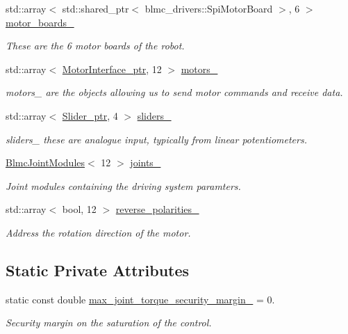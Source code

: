 \begin{DoxyCompactItemize}
std\+::array$<$ std\+::shared\+\_\+ptr$<$ blmc\+\_\+drivers\+::\+Spi\+Motor\+Board $>$, 6 $>$ \hyperlink{classblmc__robots_1_1Solo12_a84c520852a2ebd410eff9795e37473b3}{motor\+\_\+boards\+\_\+}
\begin{DoxyCompactList}\small\item\em These are the 6 motor boards of the robot. \end{DoxyCompactList}\item 
std\+::array$<$ \hyperlink{common__header_8hpp_ae1a0f9992bc8fbbc1943d887f517c180}{Motor\+Interface\+\_\+ptr}, 12 $>$ \hyperlink{classblmc__robots_1_1Solo12_a91e6592fb8a24aabb9a9795cccc130cf}{motors\+\_\+}
\begin{DoxyCompactList}\small\item\em motors\+\_\+ are the objects allowing us to send motor commands and receive data. \end{DoxyCompactList}\item 
std\+::array$<$ \hyperlink{common__header_8hpp_a4cb9a95e8b2c0bf237ce29f5252c7b73}{Slider\+\_\+ptr}, 4 $>$ \hyperlink{classblmc__robots_1_1Solo12_a4119af8c0b732d5559f8d71a9714ac29}{sliders\+\_\+}
\begin{DoxyCompactList}\small\item\em sliders\+\_\+ these are analogue input, typically from linear potentiometers. \end{DoxyCompactList}\item 
\hyperlink{classblmc__robots_1_1BlmcJointModules}{Blmc\+Joint\+Modules}$<$ 12 $>$ \hyperlink{classblmc__robots_1_1Solo12_a1949ee20f0762be56a0020af1cf5727a}{joints\+\_\+}\hypertarget{classblmc__robots_1_1Solo12_a1949ee20f0762be56a0020af1cf5727a}{}\label{classblmc__robots_1_1Solo12_a1949ee20f0762be56a0020af1cf5727a}

\begin{DoxyCompactList}\small\item\em Joint modules containing the driving system paramters. \end{DoxyCompactList}\item 
std\+::array$<$ bool, 12 $>$ \hyperlink{classblmc__robots_1_1Solo12_ace2b1af72676f4ec2d285f6166ba6922}{reverse\+\_\+polarities\+\_\+}
\begin{DoxyCompactList}\small\item\em Address the rotation direction of the motor. \end{DoxyCompactList}\end{DoxyCompactItemize}
\subsection*{Static Private Attributes}
\begin{DoxyCompactItemize}
\item 
static const double \hyperlink{classblmc__robots_1_1Solo12_a7e83448a46ffc61cc70e4b82883ee113}{max\+\_\+joint\+\_\+torque\+\_\+security\+\_\+margin\+\_\+} = 0.
\begin{DoxyCompactList}\small\item\em Security margin on the saturation of the control. \end{DoxyCompactList}\end{DoxyCompactItemize}


